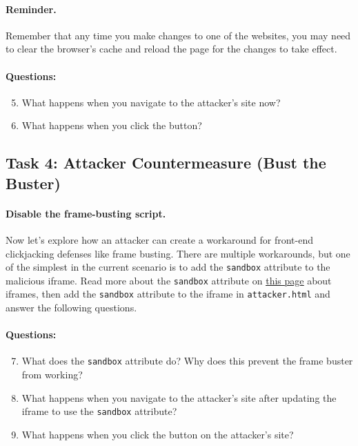 \paragraph{Reminder.} Remember that any time you make changes to one of
the websites, you may need to clear the browser's cache and reload the
page for the changes to take effect.

\paragraph{Questions:}
\begin{enumerate}
\setcounter{enumi}{4}
    \item What happens when you navigate to the attacker's site
          now?

    \item What happens when you click the button?
\end{enumerate}



\subsection{Task 4: Attacker Countermeasure (Bust the Buster)}

\paragraph{Disable the frame-busting script.}
Now let's explore how an attacker can create a
workaround for front-end clickjacking defenses like frame busting. There
are multiple workarounds, 
but one of the simplest in the current scenario is to add the
\texttt{sandbox} attribute to the malicious iframe. Read more about the
\texttt{sandbox} attribute on
\underline{\href{https://developer.mozilla.org/en-US/docs/Web/HTML/Element/iframe}{this
page}} about iframes, then add the \texttt{sandbox} attribute to the iframe
in \texttt{attacker.html} and answer the following questions.  


\paragraph{Questions:}
\begin{enumerate}
\setcounter{enumi}{6}
    \item What does the \texttt{sandbox} attribute do? 
          Why does this prevent the frame buster from working?

    \item What happens when you navigate to the attacker's site after
          updating the iframe to use the \texttt{sandbox} attribute?

    \item What happens when you click the button on the attacker's site?
\end{enumerate}


